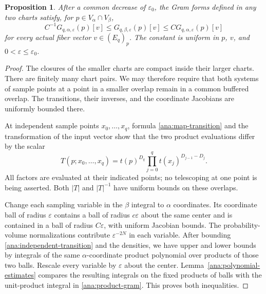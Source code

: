 \documentclass[11pt,reqno]{amsart}
\numberwithin{equation}{section}
\newtheorem{proposition}[theorem]{Proposition}
\theoremstyle{definition}
\theoremstyle{remark}
\begin{document}
\begin{proposition}\label{ana:fiber-comparison}
After a common decrease of $\varepsilon_0$, the Gram forms defined
in any two charts satisfy, for $p\in V_\alpha\cap V_\beta$,
\[
 C^{-1}G_{q,\alpha,\varepsilon}(p)[v]
 \leq G_{q,\beta,\varepsilon}(p)[v]
 \leq C G_{q,\alpha,\varepsilon}(p)[v]
\]
for every actual fiber vector $v\in(E_q)_p$.  The constant is
uniform in $p$, $v$, and $0<\varepsilon\leq\varepsilon_0$.
\end{proposition}

\begin{proof}
The closures of the smaller charts are compact inside their larger
charts.  There are finitely many chart pairs.  We may therefore require
that both systems of sample points at a point in a smaller overlap
remain in a common buffered overlap.  The transitions, their inverses,
and the coordinate Jacobians are uniformly bounded there.

At independent sample points $x_0,\ldots,x_q$, formula
\eqref{ana:map-transition} and the transformation of the input vector
show that the two product evaluations differ by the scalar
\begin{equation}\label{ana:independent-transition}
 T(p;x_0,\ldots,x_q)
 =t(p)^{D_q}\prod_{j=0}^q t(x_j)^{D_{j-1}-D_j}.
\end{equation}
All factors are evaluated at their indicated points; no telescoping
at one point is being asserted.  Both $|T|$ and $|T|^{-1}$ have
uniform bounds on these overlaps.

Change each sampling variable in the $\beta$ integral to $\alpha$
coordinates.  Its coordinate ball of radius $\varepsilon$ contains
a ball of radius $c\varepsilon$ about the same center and is contained
in a ball of radius $C\varepsilon$, with uniform Jacobian bounds.
The probability-volume normalizations contribute $\varepsilon^{-2N}$
in each variable.  After bounding \eqref{ana:independent-transition}
and the densities, we have upper and lower bounds by integrals of the
same $\alpha$-coordinate product polynomial over products of those
two balls.  Rescale every variable by $\varepsilon$ about the center.
Lemma~\ref{ana:polynomial-estimates} compares the resulting integrals
on the fixed products of balls with the unit-product integral in
\eqref{ana:product-gram}.  This proves both inequalities.
\end{proof}
\end{document}
